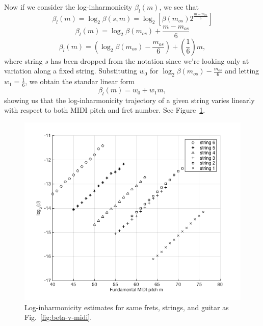 \documentclass[convention,peer-reviewed]{aesconf}
\begin{document}
Now if we consider the log-inharmonicity $\beta_{l}(m)$, we see that
\begin{equation}
\beta_l(m) = \log_2\beta(s,m) = \log_2[\beta(m_{os})2^{\frac{m-m_{os}}{6}}]
\end{equation}
\begin{equation}
\beta_l(m) = \log_2\beta(m_{os}) + \frac{m-m_{os}}{6}
\end{equation}
\begin{equation}
\beta_l(m) = (\log_2\beta(m_{os})-\frac{m_{os}}{6}) + (\frac{1}{6})m,
\end{equation}
where string $s$ has been dropped from the notation since we're looking only at variation along a fixed string. Substituting $w_0$ for $\log_2\beta(m_{os})-\frac{m_{os}}{6}$ and letting $w_1 = \frac{1}{6}$, we obtain the standar linear form
\begin{equation}
\label{eq:linear-traj}
\beta_l(m) = w_0 + w_1m,
\end{equation}
showing us that the log-inharmonicity trajectory of a given string varies linearly with respect to both MIDI pitch and fret number. See Figure~\ref{fig:log-beta-v-midi}.
\begin{figure}[!htbp] 
\centering
\includegraphics[scale=0.35]{log-beta-v-midi}
\caption{Log-inharmonicity estimates for same frets, strings, and guitar as Fig.~\ref{fig:beta-v-midi}.}
\label{fig:log-beta-v-midi}
\end{figure}
\end{document}
